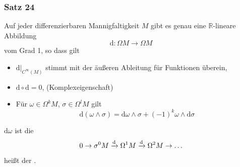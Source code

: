 \subsubsection{Satz 24} %
\label{ssub:531}
Auf jeder differenzierbaren Mannigfaltigkeit $M$ gibt es genau eine $\mathds{R}$-lineare Abbildung
\[
	\mathrm{d} : \Omega M \to \Omega M
\]
vom Grad 1, so dass gilt
\begin{itemize}
	\item $\mathrm{d}\big|_{C^\infty(M)}$ stimmt mit der äußeren Ableitung für Funktionen überein,
	\item $\mathrm{d} \circ \mathrm{d} =0$, \hfill (Komplexeigenschaft)
	\item Für $\omega \in \Omega^k M$, $\sigma \in \Omega^l M$ gilt
	\[
		\mathrm{d}(\omega \wedge \sigma) = \mathrm{d} \omega \wedge \sigma + (-1)^k \omega \wedge \mathrm{d} \sigma
	\]
\end{itemize}
$\mathrm{d} \omega$ ist die 
\[
	0 \to \sigma^0 M \xrightarrow{\mathrm{d}} \Omega^1 M \xrightarrow{\mathrm{d}} \Omega^2 M \to \ldots   
\] 
heißt der .
